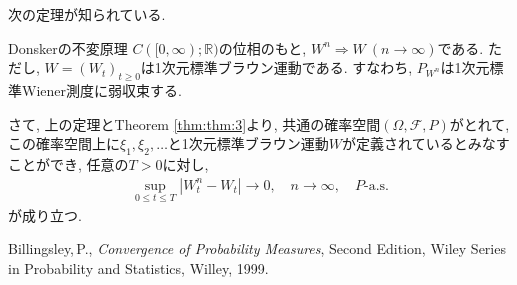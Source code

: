 次の定理が知られている.

\begin{theorem}{Donskerの不変原理}{}
    $C([0,\infty);\mathbb{R})$の位相のもと, $W^n\Rightarrow W~(n\to\infty)$である.
    ただし, $W=(W_t)_{t\geq 0}$は1次元標準ブラウン運動である.
    すなわち, $P_{W^n}$は1次元標準Wiener測度に弱収束する.
\end{theorem}

さて, 上の定理とTheorem \ref{thm:thm:3}より, 共通の確率空間$(\Omega,\mathcal{F},P)$がとれて, この確率空間上に$\xi_1,\xi_2,\dots$と1次元標準ブラウン運動$W$が定義されているとみなすことができ, 任意の$T>0$に対し,
\begin{align*}
    \sup_{0\leq t\leq T}|W^n_t-W_t|\to 0, \quad n\to\infty, \quad\text{$P$-a.s.}
\end{align*}
が成り立つ.

\begin{thebibliography}{99}
     Billingsley,\,P., \textit{Convergence of Probability Measures}, Second Edition, Wiley Series in Probability and Statistics, Willey, 1999.
\end{thebibliography}


